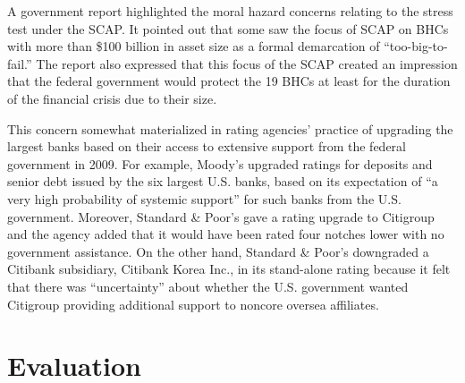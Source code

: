 \documentclass[12pt]{article}
\begin{document}
A government report highlighted the moral hazard concerns relating to
the stress test under the SCAP. It pointed out that some saw the focus
of SCAP on BHCs with more than \$100 billion in asset size as a formal
demarcation of ``too-big-to-fail.'' The report also expressed that this
focus of the SCAP created an impression that the federal government
would protect the 19 BHCs at least for the duration of the financial
crisis due to their size.\citep{OFS}

This concern somewhat materialized in rating agencies' practice of
upgrading the largest banks based on their access to extensive support
from the federal government in 2009. For example, Moody's upgraded
ratings for deposits and senior debt issued by the six largest U.S.
banks, based on its expectation of ``a very high probability of systemic
support'' for such banks from the U.S. government. Moreover, Standard \&
Poor's gave a rating upgrade to Citigroup and the agency added that it
would have been rated four notches lower with no government assistance.
On the other hand, Standard \& Poor's downgraded a Citibank subsidiary,
Citibank Korea Inc., in its stand-alone rating because it felt that
there was ``uncertainty'' about whether the U.S. government wanted
Citigroup providing additional support to noncore oversea affiliates.\citep{OFS}

\section{Evaluation}
\end{document}
